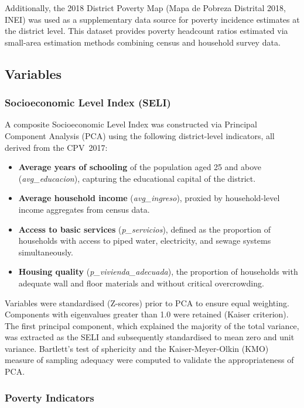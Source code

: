 \documentclass[12pt,a4paper,twoside]{article}
\begin{document}
Additionally, the 2018 District Poverty Map (Mapa de Pobreza Distrital 2018, INEI)
was used as a supplementary data source for poverty incidence estimates at the
district level. This dataset provides poverty headcount ratios estimated via
small-area estimation methods combining census and household survey data.

\subsection{Variables}

\subsubsection{Socioeconomic Level Index (SELI)}

A composite Socioeconomic Level Index was constructed via Principal Component
Analysis (PCA) using the following district-level indicators, all derived from
the CPV~2017:

\begin{itemize}
  \item \textbf{Average years of schooling} of the population aged 25 and above
        (\textit{avg\_educacion}), capturing the educational capital of the district.
  \item \textbf{Average household income} (\textit{avg\_ingreso}), proxied by
        household-level income aggregates from census data.
  \item \textbf{Access to basic services} (\textit{p\_servicios}), defined as the
        proportion of households with access to piped water, electricity, and
        sewage systems simultaneously.
  \item \textbf{Housing quality} (\textit{p\_vivienda\_adecuada}), the proportion
        of households with adequate wall and floor materials and without critical
        overcrowding.
\end{itemize}

Variables were standardised (Z-scores) prior to PCA to ensure equal weighting.
Components with eigenvalues greater than 1.0 were retained (Kaiser criterion).
The first principal component, which explained the majority of the total variance,
was extracted as the SELI and subsequently standardised to mean zero and unit
variance. Bartlett's test of sphericity and the Kaiser-Meyer-Olkin (KMO) measure
of sampling adequacy were computed to validate the appropriateness of PCA.

\subsubsection{Poverty Indicators}
\end{document}
